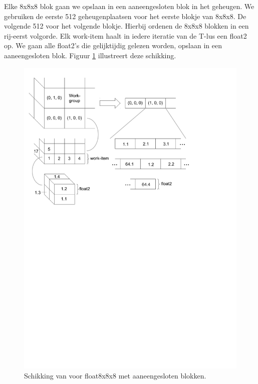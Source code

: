 Elke 8x8x8 blok gaan we opslaan in een aaneengesloten blok in het geheugen. We gebruiken de eerste 512 geheugenplaatsen voor het eerste blokje van 8x8x8. De volgende 512 voor het volgende blokje. Hierbij ordenen de 8x8x8 blokken in een rij-eerst volgorde. Elk work-item haalt in iedere iteratie van de T-lus een float2 op. We gaan alle float2's die gelijktijdig gelezen worden, opslaan in een aaneengesloten blok. Figuur \ref{remap8} illustreert deze schikking.

\begin{figure}
\centering
\includegraphics[width=\textwidth, trim=0 16cm 4cm 0, clip]{remap8}
\caption{\label{remap8}Schikking van \TT{} voor float8x8x8 met aaneengesloten blokken.}
\end{figure}


